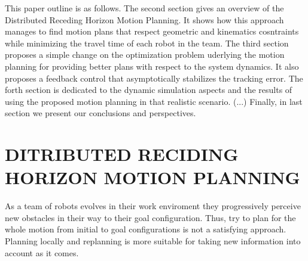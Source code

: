 \documentclass[letterpaper, 10 pt, conference]{ieeeconf}  %
\begin{document}


This paper outline is as follows. The second section gives an overview of the Distributed Receding Horizon Motion Planning. It shows how this approach manages to find motion plans that respect geometric and kinematics cosntraints while minimizing the travel time of each robot in the team. The third section proposes a simple change on the optimization problem uderlying the motion planning for providing better plans with respect to the system dynamics. It also proposes a feedback control that asymptotically stabilizes the tracking error. The forth section is dedicated to the dynamic simulation aspects and the results of using the proposed motion planning in that realistic scenario.   (...)
Finally, in last section we present our conclusions and perspectives.


\section{DITRIBUTED RECIDING HORIZON MOTION PLANNING}

As a team of robots evolves in their work enviroment they progressively perceive new obstacles in their way to their goal configuration. Thus, try to plan for the whole motion from initial to goal configurations is not a satisfying approach. Planning locally and replanning is more suitable for taking new information into account as it comes.
\end{document}
